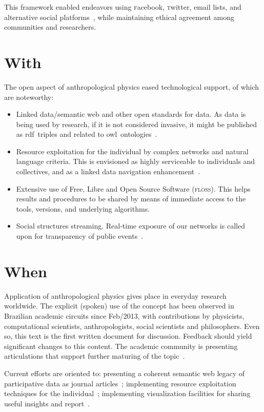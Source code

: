 \documentclass[a4paper, 11pt]{article} %
\newcommand{\twitter}{\textsc{t}witter}
\newcommand{\facebook}{\textsc{f}acebook}
\newcommand{\floss}{\textsc{floss}}
\newcommand{\owl}{{\sc owl}}
\newcommand{\rdf}{{\sc rdf}}
\begin{document}
This framework enabled endeavors using \facebook, \twitter, email lists, and alternative social platforms~\cite{ars,ocupagov,stabNet,textNet,pnud5}, while maintaining ethical agreement among communities and researchers.

\section*{With}
The open aspect of anthropological physics eased technological support, of which are noteworthy:
\begin{itemize}
    \item Linked data/semantic web and other open standards for data. As data is being used by research, if it is not considered invasive, it might be published as \rdf\ triples and related to \owl\ ontologies~\cite{LOD,linkedDataBook,pnud5}.
    \item Resource exploitation for the individual by complex networks and natural language criteria. This is envisioned as highly serviceable to individuals and collectives, and as a linked data navigation enhancement~\cite{pnud3,pnud4}.
    \item Extensive use of Free, Libre and Open Source Software (\floss). This helps results and procedures to be shared by means of immediate access to the tools, versions, and underlying algorithms.
    \item Social structures streaming. Real-time exposure of our networks is called upon for transparency of public events~\cite{ocupagov}.
\end{itemize}

\section*{When}
Application of anthropological physics gives place in everyday research worldwide.
The explicit (spoken) use of the concept has been observed in Brazilian academic circuits since
Feb/2013, with contributions by physicists, computational scientists, anthropologists, social scientists and philosophers.
Even so, this text is the first written document for discussion.
Feedback should yield significant changes to this content. The academic
community is presenting articulations that support further maturing of the topic~\cite{reunioesNexus}.

Current efforts are oriented to: presenting 
a coherent semantic web legacy of participative data 
as journal articles~\cite{pnud5}; implementing
resource exploitation techniques for the individual~\cite{pnud4};
 implementing visualization facilities for sharing useful insights
and report~\cite{ocupagov,appGMANE}.
\end{document}
